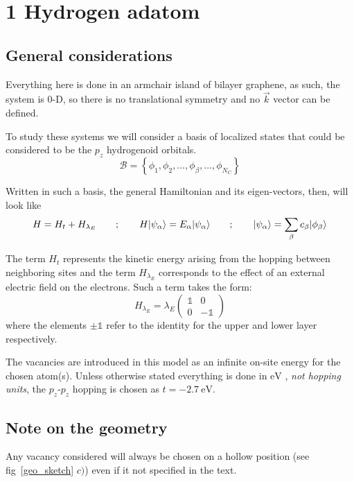 \section{1 Hydrogen adatom}
\subsection{General considerations} %
Everything here is done in an armchair island of bilayer graphene, as such, the system is $0$-D, so there is no translational symmetry and no $\vec{k}$ vector can be defined.

To study these systems we will consider a basis of localized states that could be considered to be the $p_z$ hydrogenoid orbitals.
\begin{equation}
  \mathcal{B} = \left\{\phi_1,\phi_2,\dots,\phi_\beta,\dots,\phi_{N_C}\right\}
\end{equation}

Written in such a basis, the general Hamiltonian and its eigen-vectors, then, will look like
\begin{equation}
  H = H_t + H_{\lambda_E} \quad\quad;\quad\quad
  H|\psi_\alpha\rangle = E_\alpha|\psi_\alpha\rangle \quad\quad;\quad\quad
  |\psi_\alpha\rangle = \sum_\beta c_\beta|\phi_\beta\rangle
\label{general}
\end{equation}


The term $H_t$ represents the kinetic energy arising from the hopping between neighboring sites and the term $H_{\lambda_E}$ corresponds to the effect of an external electric field on the electrons. Such a term takes the form:
\begin{equation}
  H_{\lambda_E} = \lambda_E
  \left(\begin{array}{cc}
  \mathds{1} & 0 \\
  0 & -\mathds{1}
  \end{array}\right)
\end{equation}
where the elements $\pm\mathds{1}$ refer to the identity for the upper and lower layer respectively.

The vacancies are introduced in this model as an infinite on-site energy for the chosen atom(s). Unless otherwise stated everything is done in $\si{\eV}$ %
, \emph{not hopping units}, the $p_z$-$p_z$ hopping is chosen as $t=\SI{-2.7}{\eV}$.





\subsection{Note on the geometry}
Any vacancy considered will always be chosen on a hollow position (see fig~\ref{geo_sketch} $c)$) even if it not specified in the text.


